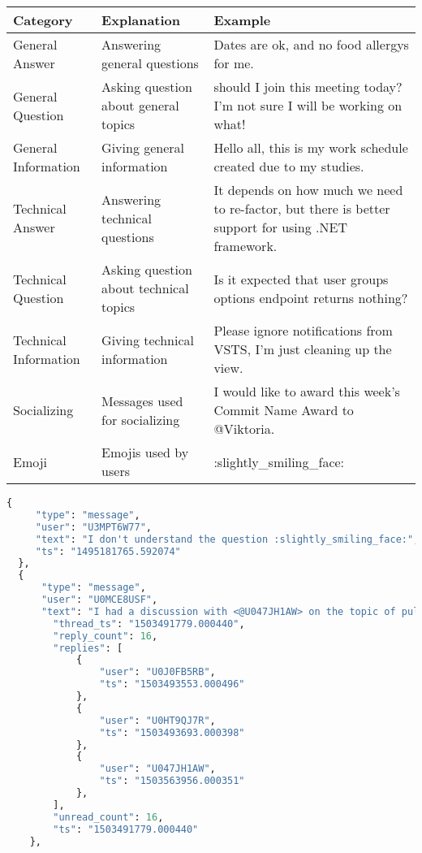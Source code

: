 \begin{sidewaystable}[htb]
\caption{Nvivo categories used in coding, with explanation and examples}
\label{tab:nvivo}
\bigskip
\centering\small\setlength\tabcolsep{2pt}
\hspace*{-1cm}\begin{tabular}{lll}
\toprule
\textbf{Category} & \textbf{Explanation} & \textbf{Example}\\
\midrule
General Answer & Answering general questions & Dates are ok, and no food allergys for me.\\
General Question & Asking question about general topics &  should I join this meeting today? I'm not sure I will be working on what!\\
General Information & Giving general information & Hello all, this is my work schedule created due to my studies.\\
Technical Answer & Answering technical questions & It depends on how much we need to re-factor, but there is better support for using .NET framework.\\ 
Technical Question & Asking question about technical topics & Is it expected that user groups options endpoint returns nothing?\\ 
Technical Information & Giving technical information & Please ignore notifications from VSTS, I'm just cleaning up the view.\\ 
Socializing & Messages used for socializing & I would like to award this week’s Commit Name Award to @Viktoria.\\
Emoji & Emojis used by users & :slightly\_smiling\_face: \\
\bottomrule
\end{tabular}\hspace*{-1cm}
\end{sidewaystable}


\begin{lstlisting}[caption={JSON sample of Slack logs},label={lst:json},language=Python,basicstyle=\tiny]
 {
     "type": "message",
     "user": "U3MPT6W77",
     "text": "I don't understand the question :slightly_smiling_face:",
     "ts": "1495181765.592074"
  },
  {
      "type": "message",
      "user": "U0MCE8USF",
      "text": "I had a discussion with <@U047JH1AW> on the topic of pulling through 'Multiple language support in Web client'. The suggestion is to create a separate story for 'cache key' for MVP3. <@U03V1DDPM> does this sound ok for you?",
        "thread_ts": "1503491779.000440",
        "reply_count": 16,
        "replies": [
            {
                "user": "U0J0FB5RB",
                "ts": "1503493553.000496"
            },
            {
                "user": "U0HT9QJ7R",
                "ts": "1503493693.000398"
            },
            {
                "user": "U047JH1AW",
                "ts": "1503563956.000351"
            },
        ],
        "unread_count": 16,
        "ts": "1503491779.000440"
    },
\end{lstlisting}